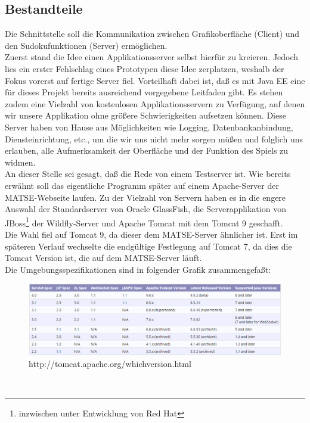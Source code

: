 \documentclass[a4paper,12pt]{scrreprt}
\begin{document}
	\subsection{Bestandteile}
	Die Schnittstelle soll die Kommunikation zwischen Grafikoberfl\"ache (Client) und den
	Sudokufunktionen (Server) erm\"oglichen.\medskip \\
	Zuerst stand die Idee einen Applikationsserver selbst hierf\"ur zu kreieren. Jedoch lies ein
	erster Fehlschlag eines Prototypen diese Idee zerplatzen, weshalb der Fokus vorerst auf fertige
	Server fiel. Vorteilhaft dabei ist, da{\ss} es mit Java EE eine f\"ur dieses Projekt bereits
	ausreichend vorgegebene Leitfaden gibt. Es stehen zudem eine Vielzahl von kostenlosen
	Applikationsservern zu Verf\"ugung, auf denen wir unsere Applikation ohne gr\"o{\ss}ere
	Schwierigkeiten aufsetzen k\"onnen. Diese Server haben von Hause aus M\"oglichkeiten wie
	Logging, Datenbankanbindung, Diensteinrichtung, etc., um die wir uns nicht mehr sorgen
	m\"u{\ss}en und folglich uns erlauben, alle Aufmerksamkeit der Oberfl\"ache und der Funktion
	des Spiels zu widmen.\medskip \\
	An dieser Stelle sei gesagt, da{\ss} die Rede von einem Testserver ist. Wie bereits erw\"ahnt soll
	das eigentliche Programm sp\"ater auf einem Apache-Server der MATSE-Webseite laufen. Zu der
	Vielzahl von Servern haben es in die engere Auswahl der Standardserver von Oracle GlassFish,
	die Serverapplikation von JBoss\footnote{inzwischen unter Entwicklung von Red Hat} der
	Wildfly-Server und Apache Tomcat mit dem Tomcat 9 geschafft.\medskip \\
	Die Wahl fiel auf Tomcat 9, da dieser dem MATSE-Server \"ahnlicher ist. Erst im sp\"ateren Verlauf
	wechselte die endg\"ultige Festlegung auf Tomcat 7, da dies die Tomcat Version ist, die auf dem
	MATSE-Server l\"auft.\medskip \\
	Die Umgebungsspezifikationen sind in folgender Grafik zusammengefa{\ss}t:
	\begin{figure}[h]
		\includegraphics[scale=0.55]{pictures/Tomcat-Versionsvergleich}
		\caption{http://tomcat.apache.org/whichversion.html}
	\end{figure}\medskip \\
\end{document}
